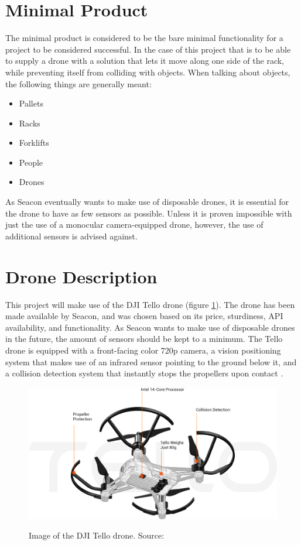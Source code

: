 \section{Minimal Product}
The minimal product is considered to be the bare minimal functionality for a project to be considered successful. In the case of this project that is to be able to supply a drone with a solution that lets it move along one side of the rack, while preventing itself from colliding with objects. When talking about objects, the following things are generally meant:
\begin{itemize}
	\itemsep0em
	\item Pallets
	\item Racks
	\item Forklifts
	\item People
	\item Drones
\end{itemize}
\noindent
As Seacon eventually wants to make use of disposable drones, it is essential for the drone to have as few sensors as possible. Unless it is proven impossible with just the use of a monocular camera-equipped drone, however, the use of additional sensors is advised against.

\section{Drone Description}
This project will make use of the DJI Tello drone (figure \ref{fig:tello}). The drone has been made available by Seacon, and was chosen based on its price, sturdiness, API availability, and functionality. As Seacon wants to make use of disposable drones in the future, the amount of sensors should be kept to a minimum. The Tello drone is equipped with a front-facing color 720p camera, a vision positioning system that makes use of an infrared sensor pointing to the ground below it, and a collision detection system that instantly stops the propellers upon contact \citep{tello}.

\begin{figure}[h]
	\centering
	\includegraphics[width=0.75\linewidth]{img/tello}
	\label{fig:tello}
	\caption[Image of the Tello drone.]{Image of the DJI Tello drone. Source: \citep{tello}}
\end{figure}

